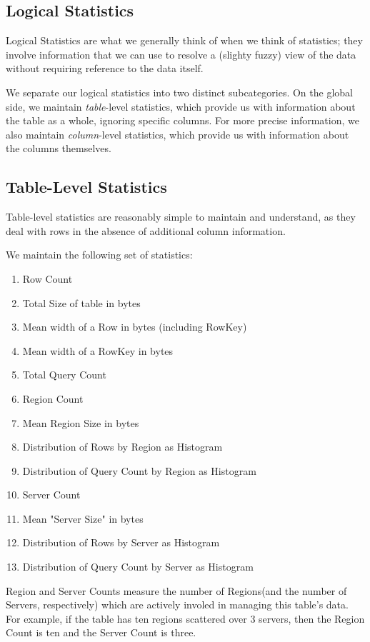 \subsection{Logical Statistics}
Logical Statistics are what we generally think of when we think of statistics; they involve information that we can use to resolve a (slighty fuzzy) view of the data without requiring reference to the data itself.

We separate our logical statistics into two distinct subcategories. On the global side, we maintain \emph{table}-level statistics, which provide us with information about the table as a whole, ignoring specific columns. For more precise information, we also maintain \emph{column}-level statistics, which provide us with information about the columns themselves.

\subsection{Table-Level Statistics}
Table-level statistics are reasonably simple to maintain and understand, as they deal with rows in the absence of additional column information. 

We maintain the following set of statistics:

\begin{enumerate}
				\item Row Count
				\item Total Size of table in bytes
				\item Mean width of a Row in bytes (including RowKey)
				\item Mean width of a RowKey in bytes
				\item Total Query Count
				\item Region Count
				\item Mean Region Size in bytes
				\item Distribution of Rows by Region as Histogram
				\item Distribution of Query Count by Region as Histogram
				\item Server Count
				\item Mean "Server Size" in bytes
				\item Distribution of Rows by Server as Histogram
				\item Distribution of Query Count by Server as Histogram
\end{enumerate}

Region and Server Counts measure the number of Regions(and the number of Servers, respectively) which are actively involed in managing this table's data. For example, if the table has ten regions scattered over 3 servers, then the Region Count is ten and the Server Count is three.

